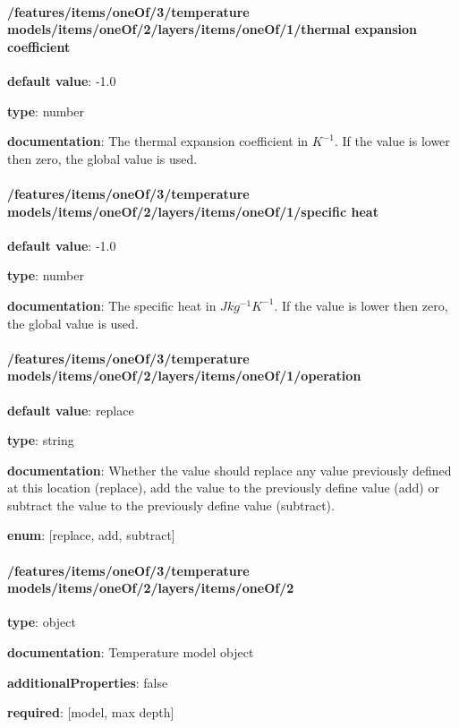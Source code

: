 \begin{itemized}
\end{itemized}\paragraph{/features/items/oneOf/3/temperature models/items/oneOf/2/layers/items/oneOf/1/thermal expansion coefficient} \begin{itemized}
\item {\bf default value}: -1.0
\item {\bf type}: number
\item {\bf documentation}: The thermal expansion coefficient in $K^{-1}$. If the value is lower then zero, the global value is used.
\end{itemized}\paragraph{/features/items/oneOf/3/temperature models/items/oneOf/2/layers/items/oneOf/1/specific heat} \begin{itemized}
\item {\bf default value}: -1.0
\item {\bf type}: number
\item {\bf documentation}: The specific heat in $J kg^{-1} K^{-1}$. If the value is lower then zero, the global value is used.
\end{itemized}\paragraph{/features/items/oneOf/3/temperature models/items/oneOf/2/layers/items/oneOf/1/operation} \begin{itemized}
\item {\bf default value}: replace
\item {\bf type}: string
\item {\bf documentation}: Whether the value should replace any value previously defined at this location (replace), add the value to the previously define value (add) or subtract the value to the previously define value (subtract).
\item {\bf enum}: [replace, add, subtract]\end{itemized}\paragraph{/features/items/oneOf/3/temperature models/items/oneOf/2/layers/items/oneOf/2} \begin{itemized}
\item {\bf type}: object
\item {\bf documentation}: Temperature model object
\item {\bf additionalProperties}: false
\item {\bf required}: [model, max depth]\end{itemized}
